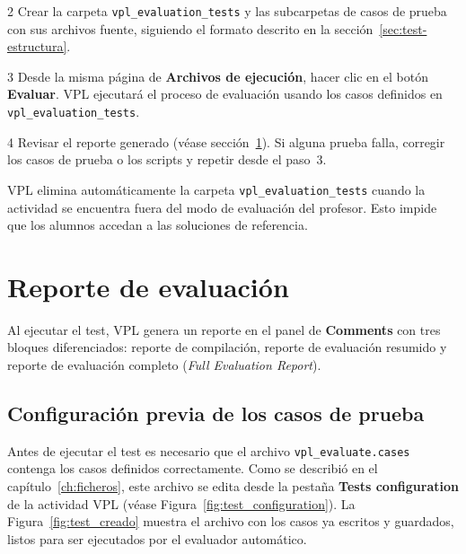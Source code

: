 \documentclass[12pt, a4paper, twoside, openany]{book}
\newcommand{\menu}[1]{\textsf{\textbf{#1}}}
\begin{document}
\begin{stepbox}{2}
  Crear la carpeta \texttt{vpl\_evaluation\_tests} y las subcarpetas de casos
  de prueba con sus archivos fuente, siguiendo el formato descrito en la
  sección~\ref{sec:test-estructura}.
\end{stepbox}

\begin{stepbox}{3}
  Desde la misma página de \textbf{Archivos de ejecución}, hacer clic en el
  botón \textbf{Evaluar}. VPL ejecutará el proceso de evaluación usando los
  casos definidos en \texttt{vpl\_evaluation\_tests}.
\end{stepbox}

\begin{stepbox}{4}
  Revisar el reporte generado (véase sección~\ref{sec:test-reporte}).
  Si alguna prueba falla, corregir los casos de prueba o los scripts y
  repetir desde el paso~3.
\end{stepbox}

\begin{warnbox}[Seguridad]
  VPL elimina automáticamente la carpeta \texttt{vpl\_evaluation\_tests}
  cuando la actividad se encuentra fuera del modo de evaluación del profesor.
  Esto impide que los alumnos accedan a las soluciones de referencia.
\end{warnbox}

\section{Reporte de evaluación}
\label{sec:test-reporte}

Al ejecutar el test, VPL genera un reporte en el panel de \textbf{Comments} con
tres bloques diferenciados: reporte de compilación, reporte de evaluación resumido
y reporte de evaluación completo (\textit{Full Evaluation Report}).

\subsection{Configuración previa de los casos de prueba}

Antes de ejecutar el test es necesario que el archivo \texttt{vpl\_evaluate.cases}
contenga los casos definidos correctamente. Como se describió en el
capítulo~\ref{ch:ficheros}, este archivo se edita desde la pestaña
\menu{Tests configuration} de la actividad VPL (véase
Figura~\ref{fig:test_configuration}). La Figura~\ref{fig:test_creado} muestra el
archivo con los casos ya escritos y guardados, listos para ser ejecutados por el
evaluador automático.
\end{document}

